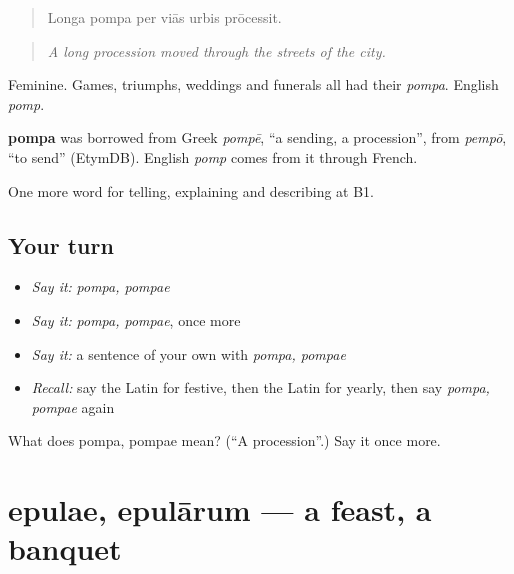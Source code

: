 \begin{quote}
Longa pompa per viās urbis prōcessit.
\end{quote}

\begin{quote}
\emph{A long procession moved through the streets of the city.}
\end{quote}

Feminine. Games, triumphs, weddings and funerals all had their \emph{pompa}. English \emph{pomp}.

\begin{cousinweb}
\textbf{pompa} was borrowed from Greek \emph{pompē}, \textquotedblleft{}a sending, a procession\textquotedblright{}, from \emph{pempō}, \textquotedblleft{}to send\textquotedblright{} (EtymDB). English \emph{pomp} comes from it through French.
\end{cousinweb}

\begin{grammarlens}[title={What you've built}]
One more word for telling, explaining and describing at B1.
\end{grammarlens}

\subsection*{Your turn}
\begin{itemize}
\raggedright
  \item \emph{Say it:} \emph{pompa, pompae}
  \item \emph{Say it:} \emph{pompa, pompae}, once more
  \item \emph{Say it:} a sentence of your own with \emph{pompa, pompae}
  \item \emph{Recall:} say the Latin for festive, then the Latin for yearly, then say \emph{pompa, pompae} again
\end{itemize}

\begin{tcolorbox}[breakable,colback=teal!4,colframe=teal!35!black,title={Before you move on}]
What does pompa, pompae mean? (\textquotedblleft{}A procession\textquotedblright{}.) Say it once more.
\end{tcolorbox}
\section[epulae, epulārum]{epulae, epulārum — a feast, a banquet}

\label{lesson:LA-C333-epulae}



